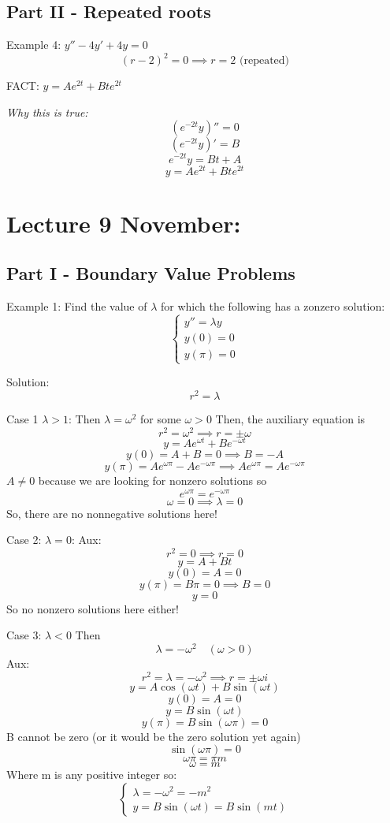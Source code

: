 \documentclass[12pt]{article}
\begin{document}
\subsection*{Part II - Repeated roots}
Example 4: $y'' - 4y' + 4y = 0$
\[(r - 2)^2 = 0 \implies r = 2 \text{ (repeated)}\]

FACT: $y = Ae^{2t} + Bte^{2t}$

\emph{Why this is true:} 
\[\left(e^{-2t} y\right)'' = 0\]
\[\left(e^{-2t} y \right)' = B\]
\[e^{-2t} y = Bt + A\]
\[y = Ae^{2t} + Bte^{2t}\]

\section{Lecture 9 November:}
\subsection*{Part I - Boundary Value Problems}
Example 1: Find the value of $\lambda$ for which the following has a zonzero solution:
\[\begin{cases}
    y'' = \lambda y\\
    y(0) = 0\\
    y(\pi) = 0
\end{cases}\]

Solution:
\[r^2 = \lambda\]

Case 1 $\lambda > 1$: Then $\lambda = \omega^2$ for some $\omega > 0$
Then, the auxiliary equation is 
\[r^2 = \omega^2 \implies r = \pm \omega\]
\[y = Ae^{\omega t} + Be^{-\omega t}\]
\[y(0) = A + B = 0 \implies B = - A\]
\[y(\pi) = Ae^{\omega \pi} - Ae^{-\omega \pi} \implies Ae^{\omega \pi} = A e^{-\omega \pi}\]
$A \neq 0$ because we are looking for nonzero solutions so 
\[e^{\omega \pi} = e^{-\omega \pi}\]
\[\omega = 0 \implies \lambda = 0\]
So, there are no nonnegative solutions here!

Case 2: $\lambda = 0$: 
Aux: 
\[r^2 = 0 \implies r = 0\]
\[y = A + Bt\]
\[y(0) = A = 0\]
\[y(\pi) = B\pi = 0 \implies B = 0\]
\[y = 0\]
So no nonzero solutions here either!

Case 3: $\lambda < 0$
Then 
\[\lambda = -\omega^2 \quad (\omega > 0)\]
Aux:
\[r^2 = \lambda = -\omega^2 \implies r = \pm \omega i\]
\[y = A\cos (\omega t) + B \sin (\omega t)\]
\[y(0) = A = 0\]
\[y = B\sin (\omega t)\]
\[y(\pi) = B\sin (\omega \pi) = 0\]
B cannot be zero (or it would be the zero solution yet again)
\[\sin (\omega \pi) = 0\]
\[\omega \pi = \pi m\]
\[\omega = m\]
Where m is any positive integer so:
\[\begin{cases}
    \lambda = -\omega^2 = -m^2\\
    y = B \sin (\omega t) = B \sin(m t)
\end{cases}\]
\end{document}
